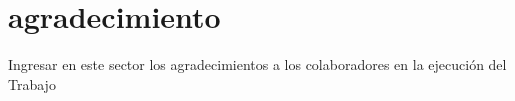 
\section*{agradecimiento}
Ingresar en este sector los agradecimientos a los colaboradores en la ejecución del Trabajo
